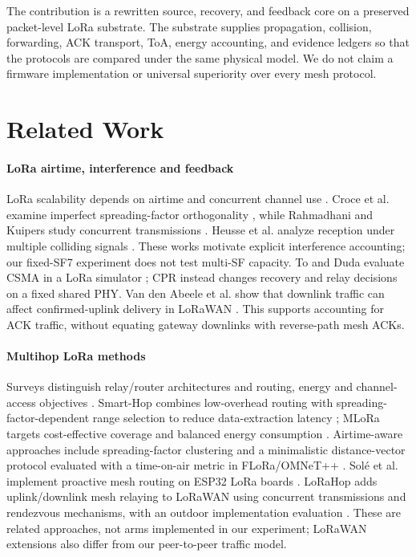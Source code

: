 \documentclass[conference,letterpaper,10pt]{IEEEtran}
\begin{document}
The contribution is a rewritten source, recovery, and feedback core on a
preserved packet-level LoRa substrate. The substrate supplies propagation,
collision, forwarding, ACK transport, ToA, energy accounting, and evidence
ledgers so that the protocols are compared under the same physical model. We
do not claim a firmware implementation or universal superiority over every
mesh protocol.

\section{Related Work}
\paragraph{LoRa airtime, interference and feedback}
LoRa scalability depends on airtime and concurrent channel use
\cite{bor2016scale,georgiou2017scale}. Croce et al. examine imperfect
spreading-factor orthogonality \cite{croce2018orthogonality}, while
Rahmadhani and Kuipers study concurrent transmissions
\cite{rahmadhani2018concurrent}. Heusse et al. analyze reception under
multiple colliding signals \cite{heusse2023capacity}. These works motivate
explicit interference accounting; our fixed-SF7 experiment does not test
multi-SF capacity. To and Duda evaluate CSMA in a LoRa simulator
\cite{to2018lorans3}; CPR instead changes recovery and relay decisions on
a fixed shared PHY. Van den Abeele et al. show that downlink traffic can
affect confirmed-uplink delivery in LoRaWAN
\cite{vandenabeele2017scalability}. This supports accounting for ACK traffic,
without equating gateway downlinks with reverse-path mesh ACKs.

\paragraph{Multihop LoRa methods}
Surveys distinguish relay/router architectures and routing, energy and
channel-access objectives \cite{cotrim2020lorawanmesh,wong2024multihop}.
Smart-Hop combines low-overhead routing with spreading-factor-dependent
range selection to reduce data-extraction latency
\cite{ahmar2022smarthop}; MLoRa targets cost-effective coverage and balanced
energy consumption \cite{feng2022cost}. Airtime-aware approaches include
spreading-factor clustering \cite{zhu2019improving} and a minimalistic
distance-vector protocol evaluated with a time-on-air metric in
FLoRa/OMNeT++ \cite{pueyo2024minimalistic}.
Sol\'e et al. implement proactive mesh routing on ESP32 LoRa boards
\cite{sole2022implementation}. LoRaHop adds uplink/downlink mesh relaying
to LoRaWAN using concurrent transmissions and rendezvous mechanisms,
with an outdoor implementation evaluation \cite{tian2023lorahop}.
These are related approaches, not arms implemented in our experiment;
LoRaWAN extensions also differ from our peer-to-peer traffic model.
\end{document}
